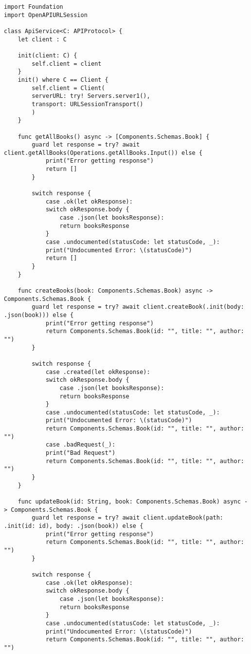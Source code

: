 \begin{lstlisting}[caption=ApiService file]
import Foundation
import OpenAPIURLSession

class ApiService<C: APIProtocol> {
    let client : C
    
    init(client: C) {
        self.client = client
    }
    init() where C == Client {
        self.client = Client(
        serverURL: try! Servers.server1(),
        transport: URLSessionTransport()
        )
    }
    
    func getAllBooks() async -> [Components.Schemas.Book] {
        guard let response = try? await client.getAllBooks(Operations.getAllBooks.Input()) else {
            print("Error getting response")
            return []
        }
        
        switch response {
            case .ok(let okResponse):
            switch okResponse.body {
                case .json(let booksResponse):
                return booksResponse
            }
            case .undocumented(statusCode: let statusCode, _):
            print("Undocumented Error: \(statusCode)")
            return []
        }
    }
    
    func createBooks(book: Components.Schemas.Book) async -> Components.Schemas.Book {
        guard let response = try? await client.createBook(.init(body: .json(book))) else {
            print("Error getting response")
            return Components.Schemas.Book(id: "", title: "", author: "")
        }
        
        switch response {
            case .created(let okResponse):
            switch okResponse.body {
                case .json(let booksResponse):
                return booksResponse
            }
            case .undocumented(statusCode: let statusCode, _):
            print("Undocumented Error: \(statusCode)")
            return Components.Schemas.Book(id: "", title: "", author: "")
            case .badRequest(_):
            print("Bad Request")
            return Components.Schemas.Book(id: "", title: "", author: "")
        }
    }
    
    func updateBook(id: String, book: Components.Schemas.Book) async -> Components.Schemas.Book {
        guard let response = try? await client.updateBook(path: .init(id: id), body: .json(book)) else {
            print("Error getting response")
            return Components.Schemas.Book(id: "", title: "", author: "")
        }
        
        switch response {
            case .ok(let okResponse):
            switch okResponse.body {
                case .json(let booksResponse):
                return booksResponse
            }
            case .undocumented(statusCode: let statusCode, _):
            print("Undocumented Error: \(statusCode)")
            return Components.Schemas.Book(id: "", title: "", author: "")
            

\end{lstlisting}

